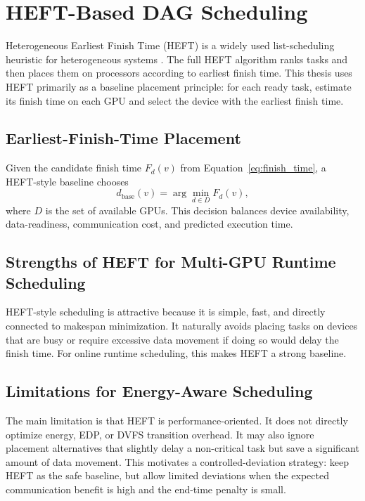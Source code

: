 \section{HEFT-Based DAG Scheduling}
\label{sec:theory_heft}

Heterogeneous Earliest Finish Time (HEFT) is a widely used list-scheduling heuristic for heterogeneous systems \cite{Topcuoglu2002HEFT}. The full HEFT algorithm ranks tasks and then places them on processors according to earliest finish time. This thesis uses HEFT primarily as a baseline placement principle: for each ready task, estimate its finish time on each GPU and select the device with the earliest finish time.

\subsection{Earliest-Finish-Time Placement}
\label{subsec:eft_placement}

Given the candidate finish time $F_d(v)$ from Equation~\eqref{eq:finish_time}, a HEFT-style baseline chooses
\begin{equation}
 d_{\mathrm{base}}(v) = \arg\min_{d \in D} F_d(v),
\label{eq:heft_baseline_device}
\end{equation}
where $D$ is the set of available GPUs. This decision balances device availability, data-readiness, communication cost, and predicted execution time.

\subsection{Strengths of HEFT for Multi-GPU Runtime Scheduling}
\label{subsec:heft_strengths}

HEFT-style scheduling is attractive because it is simple, fast, and directly connected to makespan minimization. It naturally avoids placing tasks on devices that are busy or require excessive data movement if doing so would delay the finish time. For online runtime scheduling, this makes HEFT a strong baseline.

\subsection{Limitations for Energy-Aware Scheduling}
\label{subsec:heft_limitations}

The main limitation is that HEFT is performance-oriented. It does not directly optimize energy, EDP, or DVFS transition overhead. It may also ignore placement alternatives that slightly delay a non-critical task but save a significant amount of data movement. This motivates a controlled-deviation strategy: keep HEFT as the safe baseline, but allow limited deviations when the expected communication benefit is high and the end-time penalty is small.

